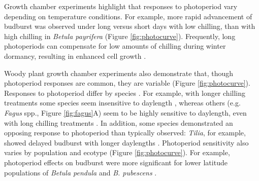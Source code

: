 \documentclass{article}
\begin{document}
\par Growth chamber experiments highlight that responses to photoperiod vary depending on temperature conditions. For example, more rapid advancement of budburst was observed under long versus short days with low chilling, than with high chilling in \emph{Betula payrifera} \citep{Hawkins:2012} (Figure \ref{fig:photocurve}). %
Frequently, long photoperiods can compensate for low amounts of chilling during winter dormancy, resulting in enhanced cell growth \citep{Heide:1993,Myking:1995,Caffarra:2011b}.%
\par Woody plant growth chamber experiments also demonstrate that, though photoperiod responses are common, they are variable (Figure \ref{fig:photocurve}). Responses to photoperiod differ by species \citep[e.g.,][]{Heide:1993a,Howe:1996,Basler:2012, Basler:2014aa,zohner2016,flynn2018}.
For example, with longer chilling treatments some species seem insensitive to daylength \citep[e.g.,\emph{Hammamelis} spp., \emph{Prunus} spp.][]{zohner2016}, %
whereas others (e.g. \emph{Fagus} spp., Figure \ref{fig:fagus}A) seem to be highly sensitive to daylength, even with long chilling treatments \citep{zohner2016}. In addition, some species demonstrated an opposing response to photoperiod than typically observed: \emph{Tilia}, for example, showed delayed budburst with longer daylengths \citep[Figure \ref{fig:photocurve},][]{Ashby:1962aa}. %
Photoperiod sensitivity also varies by population and ecotype \citep[e.g.,][]{Partanen:2005aa} (Figure \ref{fig:photocurve}). For example, photoperiod effects on budburst were more significant for lower latitude populations of \emph{Betula pendula} and \emph{B. pubescens} \citep{Partanen:2005aa}. %
\end{document}
